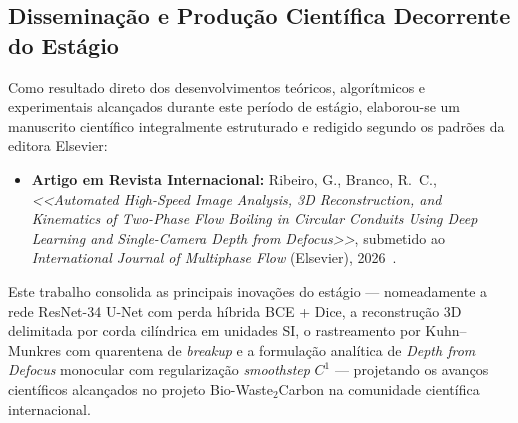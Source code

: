 \subsection{Disseminação e Produção Científica Decorrente do Estágio}
\label{subsec:producao_cientifica}

Como resultado direto dos desenvolvimentos teóricos, algorítmicos e experimentais alcançados durante este período de estágio, elaborou-se um manuscrito científico integralmente estruturado e redigido segundo os padrões da editora Elsevier:
\begin{itemize}
    \item \textbf{Artigo em Revista Internacional:} Ribeiro, G., Branco, R.~C., \emph{<<Automated High-Speed Image Analysis, 3D Reconstruction, and Kinematics of Two-Phase Flow Boiling in Circular Conduits Using Deep Learning and Single-Camera Depth from Defocus>>}, submetido ao \emph{International Journal of Multiphase Flow} (Elsevier), 2026~\cite{ribeiro2026automated}.
\end{itemize}
Este trabalho consolida as principais inovações do estágio --- nomeadamente a rede ResNet-34 U-Net com perda híbrida BCE + Dice, a reconstrução 3D delimitada por corda cilíndrica em unidades SI, o rastreamento por Kuhn--Munkres com quarentena de \emph{breakup} e a formulação analítica de \emph{Depth from Defocus} monocular com regularização \emph{smoothstep} $C^1$ --- projetando os avanços científicos alcançados no projeto Bio-Waste$_2$Carbon na comunidade científica internacional.
